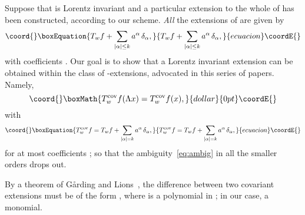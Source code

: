 \documentclass[a4paper,12pt]{article}
\renewcommand{\a}{\alpha}          %
\providecommand{\cov}{{\mathrm{cov}}}  %
\providecommand{\dl}{\delta}           %
\providecommand{\La}{\Lambda}          %
\providecommand{\R}{\mathbb{R}}        %
\providecommand{\7}{\dagger}           %
\theoremstyle{plain}
\theoremstyle{definition}
\begin{document}
Suppose that \coordHE{} is Lorentz invariant and a particular extension
\coordHE{} to the whole of \myHighlight{$\R^{4n}$}\coordHE{} has been constructed, according to
our scheme. \textit{All} the extensions of \coordHE{} are given by
\begin{equation}\coord{}\boxEquation{
T_w f + \sum_{|\a|\leq k}a^\a\,\dl_{\a},
\label{eq:ambig}
}{
T_w f + \sum_{|\a|\leq k}a^\a\,\dl_{\a},
}{ecuacion}\coordE{}\end{equation}
with \coordHE{} coefficients \myHighlight{$a^\a$}\coordHE{}. Our goal is to show
that a Lorentz
invariant extension \myHighlight{$T^\cov_wf$}\coordHE{} can be obtained within the class of
\coordHE{}-extensions, advocated in this series of papers. Namely,
$$\coord{}\boxMath{
T^\cov_w f(\La x) = T^\cov_w f(x),
}{dollar}{0pt}\coordE{}$$
with
\begin{equation}\coord{}\boxEquation{
T^\cov_w f = T_w f + \sum_{|\a|=k} a^\a\,\dl_{\a},
\label{eq:forcov}
}{
T^\cov_w f = T_w f + \sum_{|\a|=k} a^\a\,\dl_{\a},
}{ecuacion}\coordE{}\end{equation}
for at most \coordHE{} coefficients \myHighlight{$a^\a$}\coordHE{};
so that the ambiguity~\eqref{eq:ambig} in all the smaller orders drops
out.

By a theorem of G{\aa}rding and Lions~\cite{SwFr}, the difference
between two covariant extensions must be of the form \myHighlight{$P(\square)\dl$}\coordHE{},
where \coordHE{} is a polynomial in \myHighlight{$\square$}\coordHE{}; in our case, a
monomial.
\end{document}
